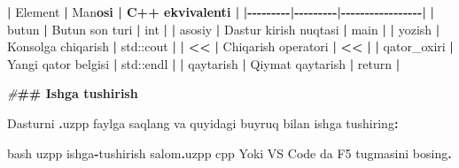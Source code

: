 \documentclass[a4paper,11pt,twoside,openright]{book}
\newenvironment{Shaded}{\begin{snugshade}}{\end{snugshade}}
\newcommand{\BuiltInTok}[1]{#1}
\newcommand{\CharTok}[1]{\textcolor[rgb]{0.31,0.60,0.02}{#1}}
\newcommand{\ErrorTok}[1]{\textcolor[rgb]{0.64,0.00,0.00}{\textbf{#1}}}
\newcommand{\NormalTok}[1]{#1}
\newcommand{\OperatorTok}[1]{\textcolor[rgb]{0.81,0.36,0.00}{\textbf{#1}}}
\newcommand{\PreprocessorTok}[1]{\textcolor[rgb]{0.56,0.35,0.01}{\textit{#1}}}
\begin{document}
\begin{Shaded}
\begin{Highlighting}[]
\OperatorTok{|}\NormalTok{ Element }\OperatorTok{|}\NormalTok{ Ma}\CharTok{\textquotesingle{}n}\ErrorTok{osi | C++ ekvivalenti |}
\OperatorTok{|{-}{-}{-}{-}{-}{-}{-}{-}{-}|{-}{-}{-}{-}{-}{-}{-}{-}{-}|{-}{-}{-}{-}{-}{-}{-}{-}{-}{-}{-}{-}{-}{-}{-}{-}{-}|}
\OperatorTok{|} \ErrorTok{\textasciigrave{}}\NormalTok{butun}\ErrorTok{\textasciigrave{}} \OperatorTok{|}\NormalTok{ Butun son turi }\OperatorTok{|} \ErrorTok{\textasciigrave{}}\NormalTok{int}\ErrorTok{\textasciigrave{}} \OperatorTok{|}
\OperatorTok{|} \ErrorTok{\textasciigrave{}}\NormalTok{asosiy}\ErrorTok{\textasciigrave{}} \OperatorTok{|}\NormalTok{ Dastur kirish nuqtasi }\OperatorTok{|} \ErrorTok{\textasciigrave{}}\NormalTok{main}\ErrorTok{\textasciigrave{}} \OperatorTok{|}
\OperatorTok{|} \ErrorTok{\textasciigrave{}}\NormalTok{yozish}\ErrorTok{\textasciigrave{}} \OperatorTok{|}\NormalTok{ Konsolga chiqarish }\OperatorTok{|} \ErrorTok{\textasciigrave{}}\BuiltInTok{std::}\NormalTok{cout}\ErrorTok{\textasciigrave{}} \OperatorTok{|}
\OperatorTok{|} \ErrorTok{\textasciigrave{}}\OperatorTok{\textless{}\textless{}}\ErrorTok{\textasciigrave{}} \OperatorTok{|}\NormalTok{ Chiqarish operatori }\OperatorTok{|} \ErrorTok{\textasciigrave{}}\OperatorTok{\textless{}\textless{}}\ErrorTok{\textasciigrave{}} \OperatorTok{|}
\OperatorTok{|} \ErrorTok{\textasciigrave{}}\NormalTok{qator\_oxiri}\ErrorTok{\textasciigrave{}} \OperatorTok{|}\NormalTok{ Yangi qator belgisi }\OperatorTok{|} \ErrorTok{\textasciigrave{}}\BuiltInTok{std::}\NormalTok{endl}\ErrorTok{\textasciigrave{}} \OperatorTok{|}
\OperatorTok{|} \ErrorTok{\textasciigrave{}}\NormalTok{qaytarish}\ErrorTok{\textasciigrave{}} \OperatorTok{|}\NormalTok{ Qiymat qaytarish }\OperatorTok{|} \ErrorTok{\textasciigrave{}}\NormalTok{return}\ErrorTok{\textasciigrave{}} \OperatorTok{|}

\PreprocessorTok{\#}\ErrorTok{\#\# Ishga tushirish}

\NormalTok{Dasturni }\ErrorTok{\textasciigrave{}}\OperatorTok{.}\NormalTok{uzpp}\ErrorTok{\textasciigrave{}}\NormalTok{ faylga saqlang va quyidagi buyruq bilan ishga tushiring}\OperatorTok{:}

\ErrorTok{\textasciigrave{}\textasciigrave{}\textasciigrave{}}\NormalTok{bash}
\NormalTok{uzpp ishga}\OperatorTok{{-}}\NormalTok{tushirish salom}\OperatorTok{.}\NormalTok{uzpp}
\ErrorTok{\textasciigrave{}\textasciigrave{}\textasciigrave{}}\NormalTok{cpp}
\NormalTok{Yoki VS Code da }\ErrorTok{\textasciigrave{}}\NormalTok{F5}\ErrorTok{\textasciigrave{}}\NormalTok{ tugmasini bosing}\OperatorTok{.}


\end{Highlighting}
\end{Shaded}
\end{document}
